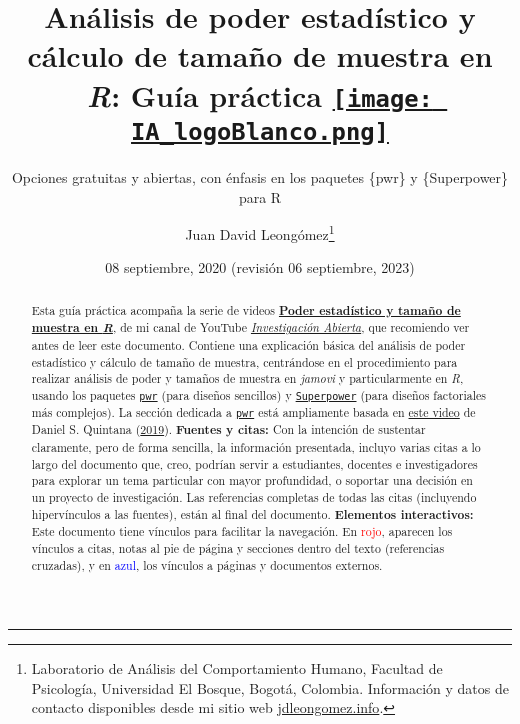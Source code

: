 \documentclass[
]{article}
\title{\textbf{Análisis de poder estadístico y cálculo de tamaño de
muestra en \emph{R}: Guía práctica}
\href{https://www.youtube.com/user/juanleongomez}{\texttt{[image: IA\_logoBlanco.png]}}}
\subtitle{Opciones gratuitas y abiertas, con énfasis en los paquetes
\{pwr\} y \{Superpower\} para R}
\author{Juan David Leongómez\footnote{Laboratorio de Análisis del
  Comportamiento Humano, Facultad de Psicología, Universidad El Bosque,
  Bogotá, Colombia. Información y datos de contacto disponibles desde mi
  sitio web \href{https://jdleongomez.info/es/}{jdleongomez.info}.}}
\date{08 septiembre, 2020 (revisión 06 septiembre, 2023)}
\begin{document}
\maketitle
\begin{abstract}
Esta guía práctica acompaña la serie de videos
\href{https://www.youtube.com/playlist?list=PLHk7UNt35ccVdyHqnQ6oXVYA6JBNFrE1x}{\textbf{Poder
estadístico y tamaño de muestra en \emph{R}}}, de mi canal de YouTube
\href{https://www.youtube.com/user/juanleongomez}{\emph{Investigación
Abierta}}, que recomiendo ver antes de leer este documento. Contiene una
explicación básica del análisis de poder estadístico y cálculo de tamaño
de muestra, centrándose en el procedimiento para realizar análisis de
poder y tamaños de muestra en \emph{jamovi} y particularmente en
\emph{R}, usando los paquetes
\href{https://www.rdocumentation.org/packages/pwr/versions/1.3-0}{\texttt{pwr}}
(para diseños sencillos) y
\href{https://cran.r-project.org/web/packages/Superpower/vignettes/intro_to_superpower.html}{\texttt{Superpower}}
(para diseños factoriales más complejos). La sección dedicada a
\href{https://www.rdocumentation.org/packages/pwr/versions/1.3-0}{\texttt{pwr}}
está ampliamente basada en \href{https://youtu.be/ZIjOG8LTTh8}{este
video} de Daniel S. Quintana
(\protect\hyperlink{ref-quintanaNontechnicalGuidePerforming2019}{2019}).
\newline \newline \textbf{Fuentes y citas:} Con la intención de
sustentar claramente, pero de forma sencilla, la información presentada,
incluyo varias citas a lo largo del documento que, creo, podrían servir
a estudiantes, docentes e investigadores para explorar un tema
particular con mayor profundidad, o soportar una decisión en un proyecto
de investigación. Las referencias completas de todas las citas
(incluyendo hipervínculos a las fuentes), están al final del documento.
\newline \newline \textbf{Elementos interactivos:} Este documento tiene
vínculos para facilitar la navegación. En \textcolor{red}{rojo},
aparecen los vínculos a citas, notas al pie de página y secciones dentro
del texto (referencias cruzadas), y en \textcolor{blue}{azul}, los
vínculos a páginas y documentos externos.
\end{abstract}

{
\hypersetup{linkcolor=}
\setcounter{tocdepth}{5}
\tableofcontents
}
\begin{center}\rule{0.5\linewidth}{0.5pt}\end{center}
\end{document}
